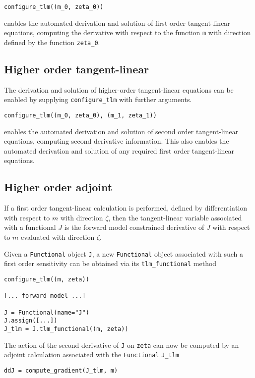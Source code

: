 \documentclass[11pt]{article}
\begin{document}
\begin{lstlisting}
configure_tlm((m_0, zeta_0))
\end{lstlisting}
enables the automated derivation and solution of first order tangent-linear
equations, computing the derivative with respect to the function \texttt{m}
with direction defined by the function \texttt{zeta\_0}.

\subsection{Higher order tangent-linear}

The derivation and solution of higher-order tangent-linear equations can be
enabled by supplying \texttt{configure\_tlm} with further arguments.

\begin{lstlisting}
configure_tlm((m_0, zeta_0), (m_1, zeta_1))
\end{lstlisting}
enables the automated derivation and solution of second order tangent-linear
equations, computing second derivative information. This also enables the
automated derivation and solution of any required first order tangent-linear
equations.

\subsection{Higher order adjoint}\label{sect:higher_order_adjoint}

If a first order tangent-linear calculation is performed, defined by
differentiation with respect to $m$ with direction $\zeta$, then the
tangent-linear variable associated with a functional $J$ is the forward model
constrained derivative of $J$ with respect to $m$ evaluated with direction
$\zeta$.

Given a \texttt{Functional} object \texttt{J}, a new \texttt{Functional} object
associated with such a first order sensitivity can be obtained via its
\texttt{tlm\_functional} method
\begin{lstlisting}
configure_tlm((m, zeta))

[... forward model ...]

J = Functional(name="J")
J.assign([...])
J_tlm = J.tlm_functional((m, zeta))
\end{lstlisting}
The action of the second derivative of \texttt{J} on \texttt{zeta} can now be
computed by an adjoint calculation associated with the \texttt{Functional}
\texttt{J\_tlm}
\begin{lstlisting}
ddJ = compute_gradient(J_tlm, m)
\end{lstlisting}
\end{document}
